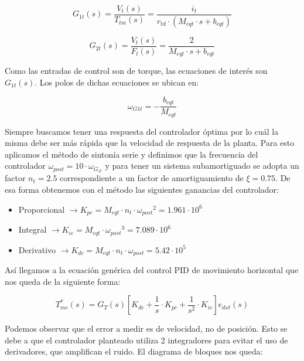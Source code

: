 \documentclass[11pt]{article}
\begin{document}
\begin{equation}
	\label{eq:sistema_carro_simplificado_laplace_G1t}
	G_{1t}(s)=\frac{V_{t}(s)}{T_{tm}(s)}=\frac{i_{t}}{r_{td}\cdot (M_{eqt}\cdot s+b_{eqt})}
\end{equation}

\begin{equation}
	\label{eq:sistema_carro_simplificado_laplace_G2t}
	G_{2t}(s)=\frac{V_{t}(s)}{F_{l}(s)}=\frac{2}{M_{eqt}\cdot s+b_{eqt}}
\end{equation}

Como las entradas de control son de torque, las ecuaciones de interés son $G_{1t}(s)$. Los polos de dichas ecuaciones se ubican en:

\begin{equation}
	\label{eq:sistema_carro_simplificado_laplace_polos}
	\omega_{G1t}=-\frac{b_{eqt}}{M_{eqt}}
\end{equation}

Siempre buscamos tener una respuesta del controlador óptima por lo cuál la misma debe ser más rápida que la velocidad de respuesta de la planta. Para esto aplicamos el método de sintonía serie y definimos que la frecuencia del controlador $\omega_{post}=10\cdot \omega_{G_{1t}}$ y para tener un sistema subamortiguado se adopta un factor $n_{t}=2.5$ correspondiente a un factor de amortiguamiento de $\xi =0.75$. De esa forma obtenemos con el método las siguientes ganancias del controlador:

\begin{itemize}
	\item Proporcional $\rightarrow K_{pc} = M_{eqt}\cdot n_{t}\cdot {\omega_{post}}^{2} = 1.961 \cdot 10^6$
	\item Integral $\rightarrow K_{ic} = M_{eqt}\cdot {\omega_{post}}^{3}  = 7.089 \cdot 10^6$
	\item Derivativo $\rightarrow K_{dc} = M_{eqt}\cdot n_{t}\cdot {\omega_{post}} = 5.42 \cdot 10^5$
\end{itemize}

Así llegamos a la ecuación genérica del control PID de movimiento horizontal que nos queda de la siguiente forma:

\begin{equation}
	\label{eq:sistema_carro_simplificado_laplace_controlador}
	T_{mc}^{*}(s)=G_{T}(s)\left [ K_{dc}+\frac{1}{s}\cdot K_{pc}+\frac{1}{s^{2}}\cdot K_{ic} \right ] e_{dxt}(s)
\end{equation}

Podemos observar que el error a medir es de velocidad, no de posición. Esto se debe a que el controlador planteado utiliza 2 integradores para evitar el uso de derivadores, que amplifican el ruido. El diagrama de bloques nos queda:
\end{document}
